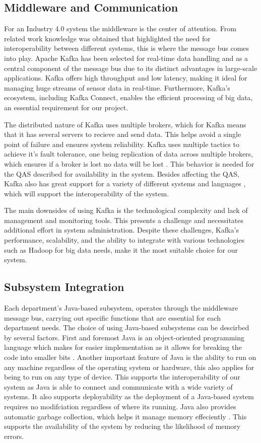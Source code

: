 \documentclass[conference]{IEEEtran}
\begin{document}
\subsection{Middleware and Communication}
For an Industry 4.0 system the middleware is the center of attention. From related work knowledge was obtained that highlighted the need for interoperability between different systems, this is where the message bus comes into play.
Apache Kafka \cite{Apache2022Connect} has been selected for real-time data handling and as a central component of the message bus due to its distinct advantages in large-scale applications. Kafka offers high throughput and low latency, making it ideal for managing huge streams of sensor data in real-time. Furthermore, Kafka's ecosystem, including Kafka Connect, enables the efficient processing of big data, an essential requirement for our project.

The distributed nature of Kafka uses multiple brokers, which for Kafka means that it has several servers to recieve and send data. This helps avoid a single point of failure and ensures system reliability. Kafka uses multiple tactics to achieve it's fault tolerance, one being replication of data across multiple brokers, which ensures if a broker is lost no data will be lost \cite{AltexSoft_2022}. This behavior is needed for the QAS described for availability in the system.
Besides affecting the QAS, Kafka also has great support for a variety of different systems and languages \cite{AltexSoft_2022}, which will support the interoperability of the system.

The main downsides of using Kafka is the technological complexity and lack of management and monitoring tools. This presents a challenge and necessitates additional effort in system administration. Despite these challenges, Kafka's performance, scalability, and the ability to integrate with various technologies such as Hadoop for big data needs, make it the most suitable choice for our system.


\subsection{Subsystem Integration}
Each department's Java-based subsystem, operates through the middleware message bus, carrying out specific functions that are essential for each department needs.
The choice of using Java-based subsystems can be descirbed by several factors. First and foremost Java is an object-oriented programming language which makes for easier implementation as it allows for breaking the code into smaller bits \cite{Team_2022}.
Another important feature of Java is the ability to run on any machine regardless of the operating system or hardware, this also applies for being to run on any type of device. This supports the interoperability of our system as Java is able to connect and communicate with a wide variety of systems. It also supports deployability as the deployment of a Java-based system requires no modifciation regardless of where its running.
Java also provides automatic garbage collection, which helps it manage memory effeciently \cite{Team_2022}. This supports the availability of the system by reducing the likelihood of memory errors.
\end{document}
